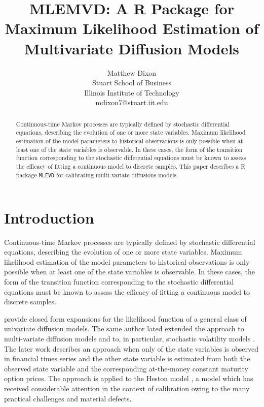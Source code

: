 \documentclass{article}
\begin{document}
\setlength{\pdfpageheight}{\paperheight}
\setlength{\pdfpagewidth}{\paperwidth}


\title{MLEMVD: A R Package for Maximum Likelihood Estimation of Multivariate Diffusion Models}

\author{Matthew Dixon\\
           Stuart School of Business\\
	   Illinois Institute of Technology\\
           mdixon7@stuart.iit.edu}

\maketitle
\begin{abstract}
Continuous-time Markov
processes are typically defined by stochastic differential equations, describing the evolution of one or more state variables.
Maximum likelihood estimation of the model parameters to historical observations is only possible when at least one of the state variables is observable. In these cases, the form of the transition function corresponding to the stochastic differential equations must be known to assess the efficacy of fitting a continuous model to discrete samples.  This paper describes a R package \verb|MLEVD| for calibrating multi-variate diffusions models.
\end{abstract}


\section{Introduction}
Continuous-time Markov
processes are typically defined by stochastic differential equations, describing the evolution of one or more state variables.
Maximum likelihood estimation of the model parameters to historical observations is only possible when at least one of the state variables is observable. In these cases, the form of the transition function corresponding to the stochastic differential equations must be known to assess the efficacy of fitting a continuous model to discrete samples.  


\cite{Sahalia2002} provide closed form expansions for the likelihood function of a general class of univariate diffusion models. The same author lated extended the approach to multi-variate diffusion models \cite{Sahalia2008} and to, in particular, stochastic volatility models \cite{Sahalia2007}. The later work describes an approach when only of the state variables is observed in financial times series and the other state variable is estimated from both the observed state variable and the corresponding at-the-money constant maturity option prices. The approach is applied to the Heston model \cite{HESTON1993}, a model which has received considerable attention in the context of calibration owing to the many practical challenges and material defects. 
\end{document}
